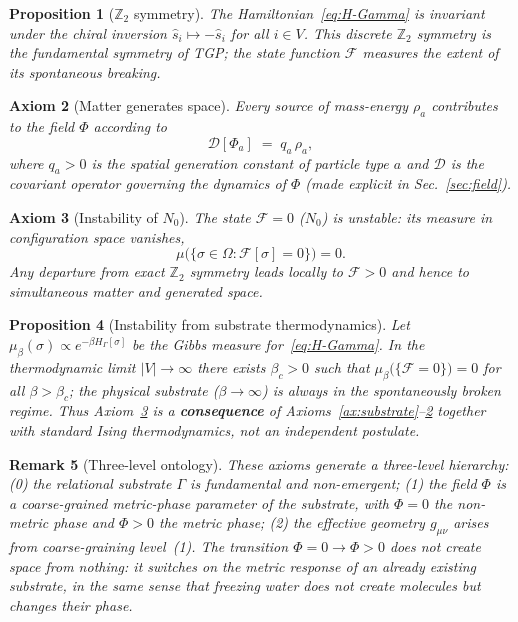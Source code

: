 \documentclass[11pt,a4paper]{article}
\renewcommand{\Phi}{\varPhi}
\newcommand{\Nzero}{N_{0}}
\newcommand{\Ffield}{\mathcal{F}}
\newcommand{\Zp}{\mathbb{Z}_{2}}
\newcommand{\DD}{\mathcal{D}}
\newtheorem{axiom}{Axiom}
\newtheorem{proposition}[axiom]{Proposition}
\newtheorem{remark}[axiom]{Remark}
\begin{document}
\begin{proposition}[$\Zp$ symmetry]\label{prop:Z2}
The Hamiltonian~\eqref{eq:H-Gamma} is invariant under the chiral inversion
$\hat{s}_{i}\mapsto-\hat{s}_{i}$ for all $i\in V$. This discrete $\Zp$
symmetry is the fundamental symmetry of TGP; the state function $\Ffield$
measures the extent of its spontaneous breaking.
\end{proposition}

\begin{axiom}[Matter generates space]\label{ax:source}
Every source of mass-energy $\rho_{a}$ contributes to the field $\Phi$
according to
\begin{equation}\label{eq:source}
  \DD[\Phi_{a}]\;=\;q_{a}\,\rho_{a},
\end{equation}
where $q_{a}>0$ is the \emph{spatial generation constant} of particle
type $a$ and $\DD$ is the covariant operator governing the dynamics of
$\Phi$ (made explicit in Sec.~\ref{sec:field}).
\end{axiom}

\begin{axiom}[Instability of $\Nzero$]\label{ax:P3}
The state $\Ffield=0$ ($\Nzero$) is unstable: its measure in configuration
space vanishes,
\begin{equation}
  \mu\bigl(\{\sigma\in\Omega : \Ffield[\sigma]=0\}\bigr)=0.
\end{equation}
Any departure from exact $\Zp$ symmetry leads locally to $\Ffield>0$ and
hence to simultaneous matter and generated space.
\end{axiom}

\begin{proposition}[Instability from substrate thermodynamics]\label{prop:instability}
Let $\mu_{\beta}(\sigma)\propto e^{-\beta H_{\Gamma}[\sigma]}$ be the Gibbs
measure for~\eqref{eq:H-Gamma}. In the thermodynamic limit $|V|\to\infty$
there exists $\beta_{c}>0$ such that
$\mu_{\beta}\bigl(\{\Ffield=0\}\bigr)=0$ for all $\beta>\beta_{c}$; the
physical substrate ($\beta\to\infty$) is always in the spontaneously
broken regime. Thus Axiom~\ref{ax:P3} is a \textbf{consequence} of
Axioms~\ref{ax:substrate}--\ref{ax:source} together with standard Ising
thermodynamics, not an independent postulate.
\end{proposition}

\begin{remark}[Three-level ontology]
These axioms generate a three-level hierarchy:
(0) the relational substrate $\Gamma$ is fundamental and non-emergent;
(1) the field $\Phi$ is a coarse-grained \emph{metric-phase parameter} of
the substrate, with $\Phi=0$ the non-metric phase and $\Phi>0$ the metric
phase;
(2) the effective geometry $g_{\mu\nu}$ arises from coarse-graining
level~(1). The transition $\Phi=0\to\Phi>0$ does not create space from
nothing: it switches on the metric response of an already existing
substrate, in the same sense that freezing water does not create
molecules but changes their phase.
\end{remark}
\end{document}
